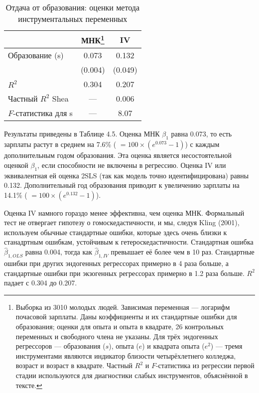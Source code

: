 \begin{table}[h]
\begin{minipage}{\textwidth}
\caption{  \label{tab:ivapp}Отдача от образования: оценки метода инструментальных переменных} 

    \begin{tabular}{lcc}
    \hline
	\hline
	& \bf{МНК}\footnote{Выборка из 3010 молодых людей. Зависимая переменная --- логарифм почасовой зарплаты. Даны коэффициенты и их стандартные ошибки для образования; оценки для опыта и опыта в квадрате, 26 контрольных переменных и свободного члена не указаны. Для трёх эндогенных регрессоров --- образования ($s$), опыта ($e$) и квадрата опыта ($e^2$) --- тремя инструментами являются индикатор близости четырёхлетнего колледжа, возраст и возраст в квадрате. Частный $R^2$ и $F$-статистика из регрессии первой стадии используются для диагностики слабых инструментов, объяснённой в тексте.} & \bf{IV} \\
	\hline
    Образование (s) & 0.073 & 0.132 \\
    	& (0.004) & (0.049) \\
    $R^2$	& 0.304 & 0.207 \\
    Частный $R^2$ Shea & --- & 0.006 \\
    $F$-статистика для s & --- & 8.07 \\
    \hline
	\hline
\end{tabular}
\end{minipage}
\end{table} 


Результаты приведены в Таблице 4.5. Оценка МНК $\beta_1$ равна 0.073, то есть зарплаты растут в среднем на 7.6\% ( $= 100 \times (e^{0.073}-1)$) с каждым дополнительным годом образования. Эта оценка является несостоятельной оценкой $\beta_1$, если способности не включены в регрессию. Оценка IV или эквивалентная ей оценка 2SLS (так как модель точно идентифицирована) равны 0.132. Дополнительный год образования приводит к увеличению зарплаты на 14.1\% ( $= 100 \times (e^{0.132}-1)$). 

Оценка IV намного гораздо менее эффективна, чем оценка МНК. Формальный тест не отвергает гипотезу о гомоскедастичности, и мы, следуя Kling (2001), используем обычные стандартные ошибки, которые здесь очень близки к станадртным ошибкам, устойчивым к гетероскедастичности. Стандартная ошибка $\hat{\beta}_{1, OLS}$ равна 0.004, тогда как $\hat{\beta}_{1, IV}$ превышает её более чем в 10 раз. Стандартные ошибки при других эндогенных регрессорах примерно в 4 раза больше, а стандартные ошибки при экзогенных регрессорах примерно в 1.2 раза больше. $R^2$ падает с 0.304 до 0.207. 

